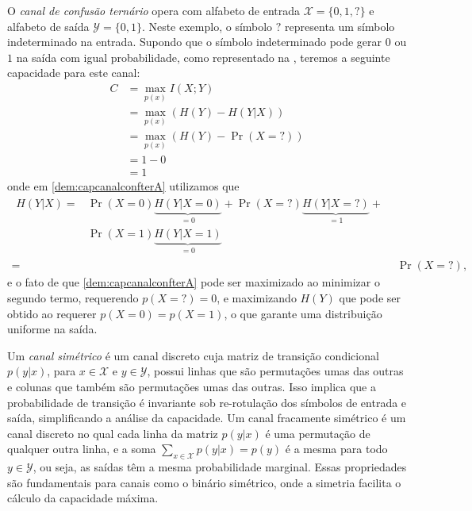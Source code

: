 O \emph{canal de confusão ternário} opera com alfabeto de entrada 
$\mathcal{X} = \{0, 1, ?\}$ e alfabeto de saída $\mathcal{Y} = \{0, 1\}$.
Neste exemplo, o símbolo $?$ representa um símbolo indeterminado na entrada.
Supondo que o símbolo indeterminado pode gerar $0$ ou $1$ na saída com igual
probabilidade, como representado na , teremos a seguinte capacidade
para este canal:
\begin{subequations}
  \begin{align}
    C &= \max_{p(x)} I(X;Y) \\
      &= \max_{p(x)} \left( H(Y) - H(Y|X) \right) \\
      &= \max_{p(x)} \left( H(Y) - \Pr(X = ?) \right) \label{dem:capcanalconfterA}\\
      &= 1 - 0 \\
      &= 1
  \end{align}
\end{subequations}
onde em \ref{dem:capcanalconfterA} utilizamos que
\begin{subequations}
  \begin{align}
    \begin{split} H(Y|X) ={}& \Pr(X=0) \underbrace{H(Y|X=0)}_{=0} + \Pr(X=?) \underbrace{H(Y|X=?)}_{=1} + \\
    & \Pr(X=1) \underbrace{H(Y|X=1)}_{=0} \end{split}\\
      ={}& \Pr(X=?) ,
  \end{align}
\end{subequations}
e o fato de que \ref{dem:capcanalconfterA} pode ser maximizado 
ao minimizar o segundo termo, requerendo $p(X=?) = 0$, e 
maximizando $H(Y)$ que pode ser obtido ao requerer $p(X=0) = p(X=1)$,
o que garante uma distribuição uniforme na saída.




\begin{definition}
Um \emph{canal simétrico} é um canal discreto cuja matriz de transição
condicional $p(y|x)$, para $x \in \mathcal{X}$ e $y \in \mathcal{Y}$, possui linhas que são
permutações umas das outras e colunas que também são permutações umas das
outras. Isso implica que a probabilidade de transição é invariante sob
re-rotulação dos símbolos de entrada e saída, simplificando a análise da
capacidade. Um canal fracamente simétrico é um canal discreto no qual
cada linha da matriz $p(y|x)$ é uma permutação de qualquer outra linha, e a
soma $\sum_{x \in \mathcal{X}} p(y|x) = p(y)$ é a mesma para todo $y \in \mathcal{Y}$, ou seja, as
saídas têm a mesma probabilidade marginal. Essas propriedades são fundamentais
para canais como o binário simétrico, onde a simetria facilita o cálculo da
capacidade máxima.
\end{definition}




